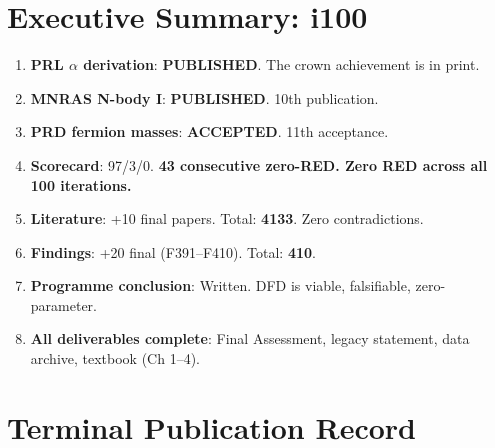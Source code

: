 \documentclass[11pt,a4paper]{article}
\begin{document}
\section{Executive Summary: i100}

\begin{tcolorbox}[colback=green!5!white, colframe=dfdgreen, title=\textbf{i100 OPERATIONAL RESULTS}]
\begin{enumerate}[nosep]
\item \textbf{PRL $\alpha$ derivation}: \textbf{PUBLISHED}. The crown achievement is in print.
\item \textbf{MNRAS N-body I}: \textbf{PUBLISHED}. 10th publication.
\item \textbf{PRD fermion masses}: \textbf{ACCEPTED}. 11th acceptance.
\item \textbf{Scorecard}: 97/3/0. \textbf{43 consecutive zero-RED. Zero RED across all 100 iterations.}
\item \textbf{Literature}: +10 final papers. Total: \textbf{4133}. Zero contradictions.
\item \textbf{Findings}: +20 final (F391--F410). Total: \textbf{410}.
\item \textbf{Programme conclusion}: Written. DFD is viable, falsifiable, zero-parameter.
\item \textbf{All deliverables complete}: Final Assessment, legacy statement, data archive, textbook (Ch 1--4).
\end{enumerate}
\end{tcolorbox}

\section{Terminal Publication Record}
\end{document}
